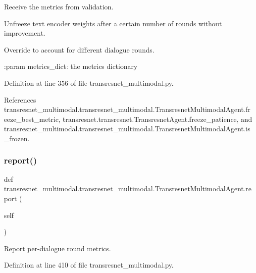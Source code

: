 \begin{DoxyVerb}Receive the metrics from validation.

Unfreeze text encoder weights after a certain number of rounds without improvement.

Override to account for different dialogue rounds.

:param metrics_dict:
    the metrics dictionary
\end{DoxyVerb}
 

Definition at line 356 of file transresnet\+\_\+multimodal.\+py.



References transresnet\+\_\+multimodal.\+transresnet\+\_\+multimodal.\+Transresnet\+Multimodal\+Agent.\+freeze\+\_\+best\+\_\+metric, transresnet.\+transresnet.\+Transresnet\+Agent.\+freeze\+\_\+patience, and transresnet\+\_\+multimodal.\+transresnet\+\_\+multimodal.\+Transresnet\+Multimodal\+Agent.\+is\+\_\+frozen.

\mbox{\label{classtransresnet__multimodal_1_1transresnet__multimodal_1_1TransresnetMultimodalAgent_a3cae694653b6742f5946b33828a4e641}} 
\subsubsection{\texorpdfstring{report()}{report()}}
{\footnotesize\ttfamily def transresnet\+\_\+multimodal.\+transresnet\+\_\+multimodal.\+Transresnet\+Multimodal\+Agent.\+report (\begin{DoxyParamCaption}\item[{}]{self }\end{DoxyParamCaption})}

\begin{DoxyVerb}Report per-dialogue round metrics.\end{DoxyVerb}
 

Definition at line 410 of file transresnet\+\_\+multimodal.\+py.



